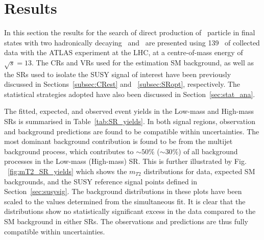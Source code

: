 	
	\section{Results}
	\label{sec:results}
	In this section the results for the search of direct production of \stau\ particle in final states with two hadronically decaying \ltau\ and \met\ are presented using 139 \infb\ of collected data with the \ac{ATLAS} experiment at the \ac{LHC}, at a centre-of-mass energy of $\sqrt{s}=13$\tev.
	The \acp{CR} and \acp{VR} used for the estimation \ac{SM} background, as well as the \acp{SR} used to isolate the \ac{SUSY} signal of interest have been previously discussed in Sections~\ref{subsec:CRest} and ~\ref{subsec:SRopt}, respectively. 
	The statistical strategies adopted have also been discussed in Section~\ref{sec:stat_ana}.
	
	The fitted, expected, and observed event yields in the Low-mass and High-mass \acp{SR} is summarised in Table~\ref{tab:SR_yields}. In both signal regions, observation and background predictions are found to be compatible within uncertainties. The most dominant background contribution is found to be from the multijet background process, which contributes to $\sim50\%$ ($\sim30\%$) of all background processes in the Low-mass (High-mass) \ac{SR}.
	This is further illustrated by Fig. ~\ref{fig:mT2_SR_yields} which shows the $m_{T2}$ distributions for data, expected \ac{SM} backgrounds, and the \ac{SUSY} reference signal points defined in Section~\ref{sec:susysig}. The background distributions in these plots have been scaled to the values determined from the simultaneous fit.
	 It is clear that the distributions show no statistically significant excess in the data compared to the \ac{SM} background in either \acp{SR}.
	  The observations and predictions are thus fully compatible within uncertainties.
	\SRyields
	\begin{table}[!hbt]
	\centering
	\caption{Observed, expected, and fitted event  yields of \ac{SM} processes in the Low-mass and High-mass \acp{SR}. The fitted event yields are given after the background-only fit. Uncertainties correspond to the sum in quadrature of statistical and systematic uncertainties. }
		
	\label{tab:SR_yields}
	\end{table}
	
